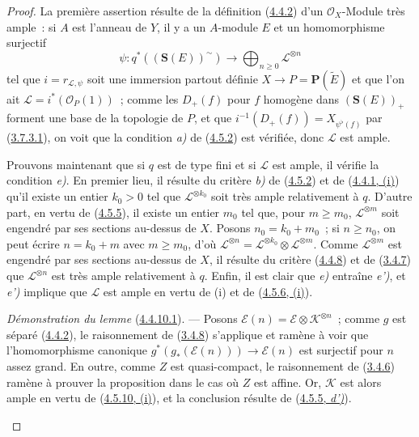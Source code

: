 \begin{proof}
La première assertion résulte de la définition
(\hyperref[II.4.4.2-fr]{4.4.2}) d'un $\mathcal{O}_X$-Module très ample~: si
$A$ est l'anneau de $Y$, il y a un $A$-module $E$ et un homomorphisme
surjectif
\[
  \psi:q^*((\mathbf{S}(E))^{\sim})\longrightarrow
  \bigoplus_{n\geq0}\mathcal{L}^{\otimes n}
\]
tel que $i=r_{\mathcal{L},\psi}$ soit une immersion partout définie
$X\to P=\mathbf{P}(\widetilde{E})$ et que l'on ait
$\mathcal{L}=i^*(\mathcal{O}_P(1))$~; comme les $D_+(f)$ pour $f$ homogène
dans $(\mathbf{S}(E))_+$ forment une base de la topologie de $P$, et que
$i^{-1}(D_+(f))=X_{\psi^\flat(f)}$ par
(\hyperref[II.3.7.3.1-fr]{3.7.3.1}), on voit que la condition \emph{a)} de
(\hyperref[II.4.5.2-fr]{4.5.2}) est vérifiée, donc $\mathcal{L}$ est ample.

Prouvons maintenant que si $q$ est de type fini et si $\mathcal{L}$ est
ample, il vérifie la condition \emph{e)}. En premier lieu, il résulte du critère \emph{b)}
de (\hyperref[II.4.5.2-fr]{4.5.2}) et de
(\hyperref[II.4.4.1-fr]{4.4.1, (i)}) qu'il existe
un entier $k_0>0$ tel que $\mathcal{L}^{\otimes k_0}$ soit très ample
relativement à $q$. D'autre part, en vertu de
(\hyperref[II.4.5.5-fr]{4.5.5}), il existe un entier $m_0$ tel que, pour
$m\geq m_0$, $\mathcal{L}^{\otimes m}$ soit engendré par ses sections
au-dessus de $X$. Posons $n_0=k_0+m_0$~; si $n\geq n_0$, on peut écrire
$n=k_0+m$ avec $m\geq m_0$, d'où
$\mathcal{L}^{\otimes n}
=\mathcal{L}^{\otimes k_0}\otimes\mathcal{L}^{\otimes m}$. Comme
$\mathcal{L}^{\otimes m}$ est engendré par ses sections au-dessus de $X$, il
résulte du critère (\hyperref[II.4.4.8-fr]{4.4.8}) et de
(\hyperref[II.3.4.7-fr]{3.4.7}) que $\mathcal{L}^{\otimes n}$ est très ample
relativement à $q$. Enfin, il est clair que \emph{e)} entraîne \emph{e')}, et \emph{e')} implique
que $\mathcal{L}$ est ample en vertu de (i) et de
(\hyperref[II.4.5.6-fr]{4.5.6, (i)}).

\begin{env}[4.5.10.1]
\label{II.4.5.10.1-fr}
\emph{Démonstration du lemme} (\hyperref[II.4.4.10.1-fr]{4.4.10.1}). --- Posons
$\mathcal{E}(n)=\mathcal{E}\otimes\mathcal{K}^{\otimes n}$~; comme $g$ est
séparé (\hyperref[II.4.4.2-fr]{4.4.2}), le raisonnement de
(\hyperref[II.3.4.8-fr]{3.4.8}) s'applique et ramène à voir que
l'homomorphisme canonique
$g^*(g_*(\mathcal{E}(n)))\to\mathcal{E}(n)$ est surjectif pour $n$ assez
grand. En outre, comme $Z$ est quasi-compact, le raisonnement de
(\hyperref[II.3.4.6-fr]{3.4.6}) ramène à prouver la proposition dans le cas
où $Z$ est affine. Or, $\mathcal{K}$ est alors ample en vertu de
(\hyperref[II.4.5.10-fr]{4.5.10, (i)}), et la conclusion résulte de
(\hyperref[II.4.5.5-fr]{4.5.5, \emph{d')}}).
\end{env}
\end{proof}

